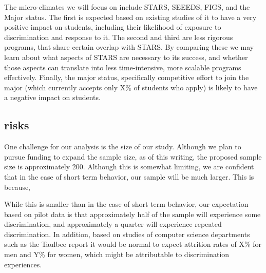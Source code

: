 The micro-climates we will focus on include STARS, SEEEDS, FIGS, and the Major status. The first is expected based on existing studies of it to have a very positive impact on students, including their likelihood of exposure to discrimination and response to it. The second and third are less rigorous programs, that share certain overlap with STARS. By comparing these we may learn about what aspects of STARS are necessary to its success, and whether those aspects can translate into less time-intensive, more scalable programs effectively. Finally, the major status, specifically competitive effort to join the major (which currently accepts only X\% of students who apply) is likely to have a negative impact on students. 

\subsection{risks}
One challenge for our analysis is the size of our study. Although we plan to pursue funding to expand the sample size, as of this writing, the proposed sample size is approximately 200. Although this is somewhat limiting, we are confident that in the case of short term behavior, our sample will be much larger. This is because, 



While this is smaller than in the case of short term behavior, our expectation based on pilot data is that approximately half of the sample will experience some discrimination, and approximately a quarter will experience repeated discrimination. In addition, based on studies of computer science departments such as the Taulbee report \cite{} it would be normal to expect attrition rates of X\% for men and Y\% for women, which might be attributable to discrimination experiences. 


